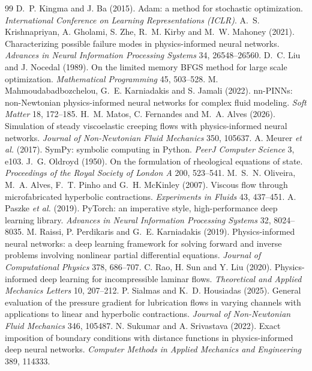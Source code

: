 \documentclass[11pt,a4paper]{article}
\begin{document}
\begin{thebibliography}{99}
 D.~P. Kingma and J. Ba (2015). Adam: a method for stochastic optimization. \emph{International Conference on Learning Representations (ICLR)}.
 A.~S. Krishnapriyan, A. Gholami, S. Zhe, R.~M. Kirby and M.~W. Mahoney (2021). Characterizing possible failure modes in physics-informed neural networks. \emph{Advances in Neural Information Processing Systems} 34, 26548--26560.
 D.~C. Liu and J. Nocedal (1989). On the limited memory BFGS method for large scale optimization. \emph{Mathematical Programming} 45, 503--528.
 M. Mahmoudabadbozchelou, G.~E. Karniadakis and S. Jamali (2022). nn-PINNs: non-Newtonian physics-informed neural networks for complex fluid modeling. \emph{Soft Matter} 18, 172--185.
 H.~M. Matos, C. Fernandes and M.~A. Alves (2026). Simulation of steady viscoelastic creeping flows with physics-informed neural networks. \emph{Journal of Non-Newtonian Fluid Mechanics} 350, 105637.
 A. Meurer \emph{et al.} (2017). SymPy: symbolic computing in Python. \emph{PeerJ Computer Science} 3, e103.
 J.~G. Oldroyd (1950). On the formulation of rheological equations of state. \emph{Proceedings of the Royal Society of London A} 200, 523--541.
 M.~S.~N. Oliveira, M.~A. Alves, F.~T. Pinho and G.~H. McKinley (2007). Viscous flow through microfabricated hyperbolic contractions. \emph{Experiments in Fluids} 43, 437--451.
 A. Paszke \emph{et al.} (2019). PyTorch: an imperative style, high-performance deep learning library. \emph{Advances in Neural Information Processing Systems} 32, 8024--8035.
 M. Raissi, P. Perdikaris and G.~E. Karniadakis (2019). Physics-informed neural networks: a deep learning framework for solving forward and inverse problems involving nonlinear partial differential equations. \emph{Journal of Computational Physics} 378, 686--707.
 C. Rao, H. Sun and Y. Liu (2020). Physics-informed deep learning for incompressible laminar flows. \emph{Theoretical and Applied Mechanics Letters} 10, 207--212.
 P. Sialmas and K.~D. Housiadas (2025). General evaluation of the pressure gradient for lubrication flows in varying channels with applications to linear and hyperbolic contractions. \emph{Journal of Non-Newtonian Fluid Mechanics} 346, 105487.
 N. Sukumar and A. Srivastava (2022). Exact imposition of boundary conditions with distance functions in physics-informed deep neural networks. \emph{Computer Methods in Applied Mechanics and Engineering} 389, 114333.

\end{thebibliography}
\end{document}
